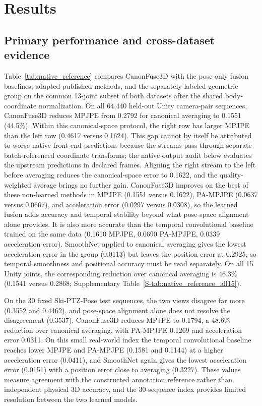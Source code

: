 \documentclass[preprint,12pt]{elsarticle}
\begin{document}
\section{Results}
\label{sec:results}

\subsection{Primary performance and cross-dataset evidence}

Table~\ref{tab:native_reference} compares CanonFuse3D with the pose-only fusion baselines, adapted published methods, and the separately labeled geometric group on the common 13-joint subset of both datasets after the shared body-coordinate normalization. On all 64,440 held-out Unity camera-pair sequences, CanonFuse3D reduces MPJPE from 0.2792 for canonical averaging to 0.1551 (44.5\%). Within this canonical-space protocol, the right row has larger MPJPE than the left row (0.4617 versus 0.1624). This gap cannot by itself be attributed to worse native front-end predictions because the streams pass through separate batch-referenced coordinate transforms; the native-output audit below evaluates the upstream predictions in declared frames. Aligning the right stream to the left before averaging reduces the canonical-space error to 0.1622, and the quality-weighted average brings no further gain. CanonFuse3D improves on the best of these non-learned methods in MPJPE (0.1551 versus 0.1622), PA-MPJPE (0.0637 versus 0.0667), and acceleration error (0.0297 versus 0.0308), so the learned fusion adds accuracy and temporal stability beyond what pose-space alignment alone provides. It is also more accurate than the temporal convolutional baseline trained on the same data (0.1610 MPJPE, 0.0690 PA-MPJPE, 0.0339 acceleration error). SmoothNet applied to canonical averaging gives the lowest acceleration error in the group (0.0113) but leaves the position error at 0.2925, so temporal smoothness and positional accuracy must be read separately. On all 15 Unity joints, the corresponding reduction over canonical averaging is 46.3\% (0.1541 versus 0.2868; Supplementary Table~\ref{S-tab:native_reference_all15}).

On the 30 fixed Ski-PTZ-Pose test sequences, the two views disagree far more (0.3552 and 0.4462), and pose-space alignment alone does not resolve the disagreement (0.3537). CanonFuse3D reduces MPJPE to 0.1794, a 48.6\% reduction over canonical averaging, with PA-MPJPE 0.1269 and acceleration error 0.0311. On this small real-world index the temporal convolutional baseline reaches lower MPJPE and PA-MPJPE (0.1581 and 0.1144) at a higher acceleration error (0.0411), and SmoothNet again gives the lowest acceleration error (0.0151) with a position error close to averaging (0.3227). These values measure agreement with the constructed annotation reference rather than independent physical 3D accuracy, and the 30-sequence index provides limited resolution between the two learned models.
\end{document}
